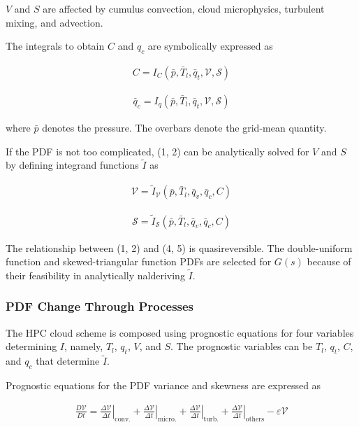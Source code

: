 \(V\) and \(S\) are affected by cumulus convection, cloud microphysics, turbulent mixing, and advection.

The integrals to obtain \(C\) and \(q_c\) are symbolically expressed as

\begin{eqnarray}
C=I_{C}\left(\bar{p}, \bar{T}_{l}, \bar{q}_{t}, \mathcal{V}, \mathcal{S}\right)
\label{W09-1}
\end{eqnarray}

\begin{eqnarray}
\bar{q}_{c}=I_{q}\left(\bar{p}, \bar{T}_{l}, \bar{q}_{t}, \mathcal{V}, \mathcal{S}\right)
\label{W09-2}
\end{eqnarray}

where \(\bar{p}\) denotes the pressure. The overbars denote the grid-mean quantity.

If the PDF is not too complicated, (1, 2) can be analytically solved for \(V\) and \(S\) by defining integrand functions \({\tilde{I}}\) as

\begin{eqnarray}
\mathcal{V}=\tilde{I}_{\mathcal{V}} \left(\bar{p}, \bar{T}_{l}, \bar{{q}}_{v}, \bar{q}_{c}, C\right)
\label{W09-4}
\end{eqnarray}

\begin{eqnarray}
\mathcal{S}=\tilde{I}_{\mathcal{S}} \left(\bar{p}, \bar{T}_{l}, \bar{{q}}_{v}, \bar{q}_{c}, C\right)
\label{W09-5}
\end{eqnarray}

The relationship between (1, 2) and (4, 5) is quasireversible. The double-uniform function and skewed-triangular function PDFs are selected for \(G(s)\) because of their feasibility in analytically
nalderiving \({\tilde{I}}\).

\hypertarget{pdf-change-through-processes}{%
\subsubsection{PDF Change Through Processes}\label{pdf-change-through-processes}}

The HPC cloud scheme is composed using prognostic equations for four variables determining \(I\), namely, \(T_l\), \(q_t\), \(V\), and \(S\). The prognostic variables can be \(T_l\), \(q_t\), \(C\),
and \(q_c\) that determine \(\tilde {I}\).

Prognostic equations for the PDF variance and skewness are expressed as

\begin{eqnarray}
\frac{D \mathcal{V}}{D t}=\left.\frac{\Delta \mathcal{V}}{\Delta t}\right|_{\mathrm{conv.}}+\left.\frac{\Delta \mathcal{V}}{\Delta t}\right|_{\mathrm{micro.}}+\left.\frac{\Delta \mathcal{V}}{\Delta t}
\right|_{\mathrm{turb.}}+\left.\frac{\Delta \mathcal{V}}{\Delta t}
\right|_{\mathrm{others}}-\varepsilon \mathcal{V}
\end{eqnarray}

